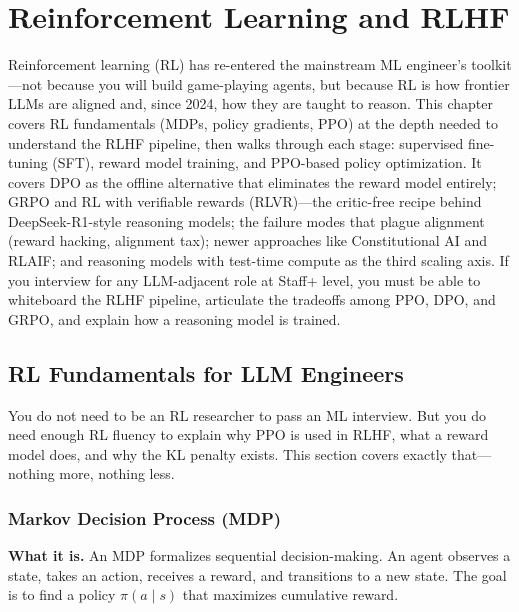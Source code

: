 \chapter{Reinforcement Learning and RLHF}
\label{chap:reinforcement_learning}

\begin{tldr}
Reinforcement learning (RL) has re-entered the mainstream ML engineer's toolkit---not because you will build game-playing agents, but because RL is how frontier LLMs are aligned and, since 2024, how they are taught to reason. This chapter covers RL fundamentals (MDPs, policy gradients, PPO) at the depth needed to understand the RLHF pipeline, then walks through each stage: supervised fine-tuning (SFT), reward model training, and PPO-based policy optimization. It covers DPO as the offline alternative that eliminates the reward model entirely; GRPO and RL with verifiable rewards (RLVR)---the critic-free recipe behind DeepSeek-R1-style reasoning models; the failure modes that plague alignment (reward hacking, alignment tax); newer approaches like Constitutional AI and RLAIF; and reasoning models with test-time compute as the third scaling axis. If you interview for any LLM-adjacent role at Staff+ level, you must be able to whiteboard the RLHF pipeline, articulate the tradeoffs among PPO, DPO, and GRPO, and explain how a reasoning model is trained.
\end{tldr}

\section{RL Fundamentals for LLM Engineers}
\label{sec:rl_fundamentals}

You do not need to be an RL researcher to pass an ML interview. But you do need enough RL fluency to explain why PPO is used in RLHF, what a reward model does, and why the KL penalty exists. This section covers exactly that---nothing more, nothing less.

\subsection{Markov Decision Process (MDP)}

\textbf{What it is.} An MDP formalizes sequential decision-making. An agent observes a state, takes an action, receives a reward, and transitions to a new state. The goal is to find a policy $\pi(a \mid s)$ that maximizes cumulative reward.

